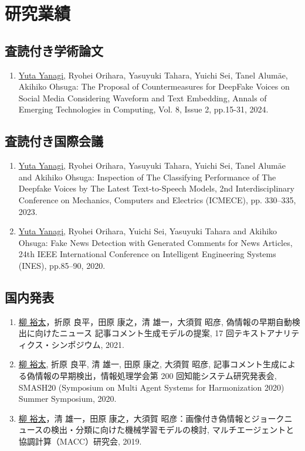 \chapter*{研究業績}
\section{査読付き学術論文}
\begin{enumerate}
    \item \underline{Yuta Yanagi}, Ryohei Orihara, Yasuyuki Tahara, Yuichi Sei, Tanel Alumäe, Akihiko Ohsuga: The Proposal of Countermeasures for DeepFake Voices on Social Media Considering Waveform and Text Embedding, Annals of Emerging Technologies in Computing, Vol. 8, Issue 2, pp.15-31, 2024.
\end{enumerate}

\section{査読付き国際会議}
\begin{enumerate}
    \item \underline{Yuta Yanagi}, Ryohei Orihara, Yasuyuki Tahara, Yuichi Sei, Tanel Alumäe and Akihiko Ohsuga: Inspection of The Classifying Performance of The Deepfake Voices by The Latest Text-to-Speech Models, 2nd Interdisciplinary Conference on Mechanics, Computers and Electrics (ICMECE), pp. 330–335, 2023.
    \item \underline{Yuta Yanagi}, Ryohei Orihara, Yuichi Sei, Yasuyuki Tahara and Akihiko Ohsuga: Fake News Detection with Generated Comments for News Articles, 24th IEEE International Conference on Intelligent Engineering Systems (INES), pp.85–90, 2020.
\end{enumerate}

\section{国内発表}
\begin{enumerate}
    \item \underline{柳 裕太}，折原 良平，田原 康之，清 雄一，大須賀 昭彦, 偽情報の早期自動検出に向けたニュース 記事コメント生成モデルの提案, 17 回テキストアナリティクス・シンポジウム, 2021.
    \item \underline{柳 裕太}, 折原 良平, 清 雄一, 田原 康之, 大須賀 昭彦, 記事コメント生成による偽情報の早期検出，情報処理学会第 200 回知能システム研究発表会, SMASH20 (Symposium on Multi Agent Systems for Harmonization 2020) Summer Symposium, 2020.
    \item \underline{柳 裕太}，清 雄一，田原 康之，大須賀 昭彦：画像付き偽情報とジョークニュースの検出・分類に向けた機械学習モデルの検討, マルチエージェントと協調計算（MACC）研究会, 2019. 
\end{enumerate}

